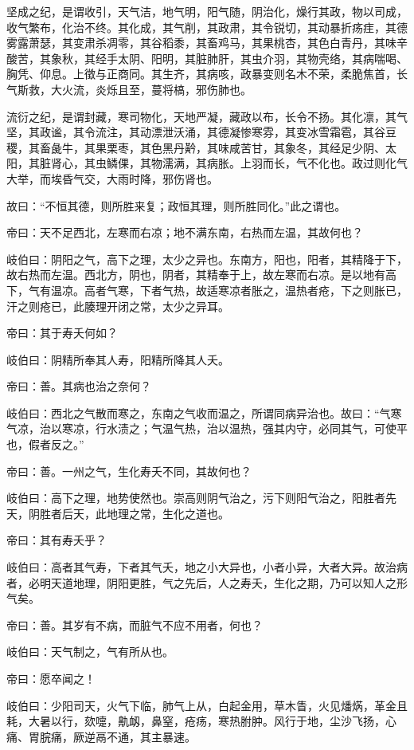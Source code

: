\documentclass{article}%
\begin{document}
坚成之纪，是谓收引，天气洁，地气明，阳气随，阴治化，燥行其政，物以司成，收气繁布，化治不终。其化成，其气削，其政肃，其令锐切，其动暴折疡疰，其德雾露萧瑟，其变肃杀凋零，其谷稻黍，其畜鸡马，其果桃杏，其色白青丹，其味辛酸苦，其象秋，其经手太阴、阳明，其脏肺肝，其虫介羽，其物壳络，其病喘喝、胸凭、仰息。上徵与正商同。其生齐，其病咳，政暴变则名木不荣，柔脆焦首，长气斯救，大火流，炎烁且至，蔓将槁，邪伤肺也。

流衍之纪，是谓封藏，寒司物化，天地严凝，藏政以布，长令不扬。其化凛，其气坚，其政谧，其令流注，其动漂泄沃涌，其德凝惨寒雰，其变冰雪霜雹，其谷豆稷，其畜彘牛，其果栗枣，其色黑丹黅，其味咸苦甘，其象冬，其经足少阴、太阳，其脏肾心，其虫鳞倮，其物濡满，其病胀。上羽而长，气不化也。政过则化气大举，而埃昏气交，大雨时降，邪伤肾也。

故曰：“不恒其德，则所胜来复；政恒其理，则所胜同化。”此之谓也。

帝曰：天不足西北，左寒而右凉；地不满东南，右热而左温，其故何也？

岐伯曰：阴阳之气，高下之理，太少之异也。东南方，阳也，阳者，其精降于下，故右热而左温。西北方，阴也，阴者，其精奉于上，故左寒而右凉。是以地有高下，气有温凉。高者气寒，下者气热，故适寒凉者胀之，温热者疮，下之则胀已，汗之则疮已，此腠理开闭之常，太少之异耳。

帝曰：其于寿夭何如？

岐伯曰：阴精所奉其人寿，阳精所降其人夭。

帝曰：善。其病也治之奈何？

岐伯曰：西北之气散而寒之，东南之气收而温之，所谓同病异治也。故曰：“气寒气凉，治以寒凉，行水渍之；气温气热，治以温热，强其内守，必同其气，可使平也，假者反之。”

帝曰：善。一州之气，生化寿夭不同，其故何也？

岐伯曰：高下之理，地势使然也。崇高则阴气治之，污下则阳气治之，阳胜者先天，阴胜者后天，此地理之常，生化之道也。

帝曰：其有寿夭乎？

岐伯曰：高者其气寿，下者其气夭，地之小大异也，小者小异，大者大异。故治病者，必明天道地理，阴阳更胜，气之先后，人之寿夭，生化之期，乃可以知人之形气矣。

帝曰：善。其岁有不病，而脏气不应不用者，何也？

岐伯曰：天气制之，气有所从也。

帝曰：愿卒闻之！

岐伯曰：少阳司天，火气下临，肺气上从，白起金用，草木眚，火见燔焫，革金且耗，大暑以行，欬嚏，鼽衂，鼻窒，疮疡，寒热胕肿。风行于地，尘沙飞扬，心痛、胃脘痛，厥逆鬲不通，其主暴速。
\end{document}
